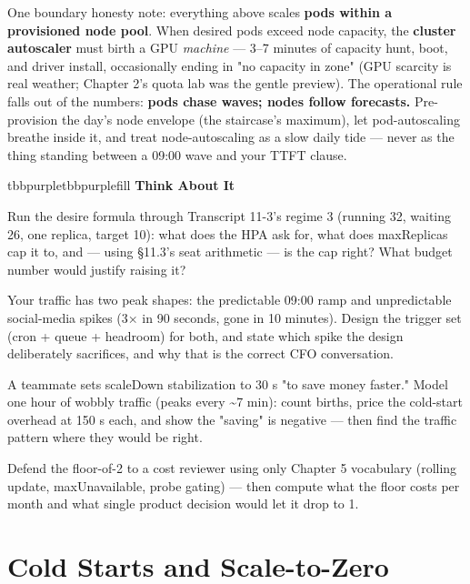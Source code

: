 One boundary honesty note: everything above scales \textbf{pods within a provisioned node pool}. When desired pods exceed node capacity, the \textbf{cluster autoscaler} must birth a GPU \textit{machine} — 3–7 minutes of capacity hunt, boot, and driver install, occasionally ending in "no capacity in zone" (GPU scarcity is real weather; Chapter 2's quota lab was the gentle preview). The operational rule falls out of the numbers: \textbf{pods chase waves; nodes follow forecasts.} Pre-provision the day's node envelope (the staircase's maximum), let pod-autoscaling breathe inside it, and treat node-autoscaling as a slow daily tide — never as the thing standing between a 09:00 wave and your TTFT clause.

\begin{calloutbox}{tbbpurple}{tbbpurplefill}
{\normalsize\bfseries\color{tbbpurple}Think About It}\par\vspace{3pt}
\begin{tbbitemize}
  \item Run the desire formula through Transcript 11-3's regime 3 (running 32, waiting 26, one replica, target 10): what does the HPA ask for, what does maxReplicas cap it to, and — using §11.3's seat arithmetic — is the cap right? What budget number would justify raising it?
  \item Your traffic has two peak shapes: the predictable 09:00 ramp and unpredictable social-media spikes (3× in 90 seconds, gone in 10 minutes). Design the trigger set (cron + queue + headroom) for both, and state which spike the design deliberately sacrifices, and why that is the correct CFO conversation.
  \item A teammate sets scaleDown stabilization to 30 s "to save money faster." Model one hour of wobbly traffic (peaks every \textasciitilde{}7 min): count births, price the cold-start overhead at 150 s each, and show the "saving" is negative — then find the traffic pattern where they would be right.
  \item Defend the floor-of-2 to a cost reviewer using only Chapter 5 vocabulary (rolling update, maxUnavailable, probe gating) — then compute what the floor costs per month and what single product decision would let it drop to 1.
\end{tbbitemize}
\end{calloutbox}

\section{Cold Starts and Scale-to-Zero}

